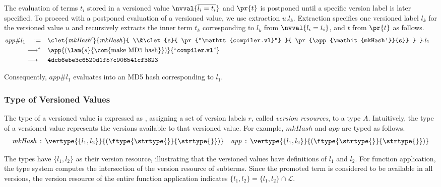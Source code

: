 The evaluation of terms $t_i$ stored in a versioned value $\nvval{\overline{l_i=t_i}}$ and $\pr{t}$ is postponed until a specific version label is later specified.
To proceed with a postponed evaluation of a versioned value, we use extraction $u.l_k$. Extraction specifies one versioned label $l_k$ for the versioned value $u$ and recursively extracts the inner term $t_k$ corresponding to $l_k$ from $\nvval{l_i=t_i}$, and $t$ from $\pr{t}$ as follows.
\begin{align*}
\mathit{app}\#l_1\quad:=\quad
&
\begin{aligned}
&\clet{\mathit{mkHash'}}{\mathit{mkHash}}{
    \\&\clet{s}{
        \pr{``\mathtt{compiler.vl}"}
    }{
        \pr{\app{\mathit{mkHash'}}{s}}
    }
}.l_1
\end{aligned}\\
\longrightarrow^* \quad&\app{(\lam{s}{\textnormal{\com{make MD5 hash}}})}{``\mathtt{compiler.vl}"}\\
\longrightarrow^{\phantom{*}}\quad &\texttt{4dcb6ebe3c6520d1f57c906541cf3823}
\end{align*}

Consequently, $\mathit{app}\#l_1$ evaluates into an MD5 hash corresponding to $l_1$.
\vspace{-\baselineskip}
\subsubsection{Type of Versioned Values}
The type of a versioned value is expressed as , assigning a set of version labels $r$, called \textit{version resources}, to a type $A$. Intuitively, the type of a versioned value represents the versions available to that versioned value. For example, $\mathit{mkHash}$ and $\mathit{app}$ are typed as follows.
\begin{align*}
\mathit{mkHash}\,:\,\vertype{\{l_1,l_2\}}{\left(\ftype{\strtype{}}{\strtype{}}\right)}\quad
\mathit{app}\,:\,\vertype{\{l_1,l_2\}}{\left(\ftype{\strtype{}}{\strtype{}}\right)}
\end{align*}

The types have $\{l_1,l_2\}$ as their version resource, illustrating that the versioned values have definitions of $l_1$ and $l_2$.
For function application, the type system computes the intersection of the version resource of subterms.
Since the promoted term is considered to be available in all versions, the version resource of the entire function application indicates $\{l_1,l_2\} = \{l_1,l_2\} \cap \mathcal{L}$.

